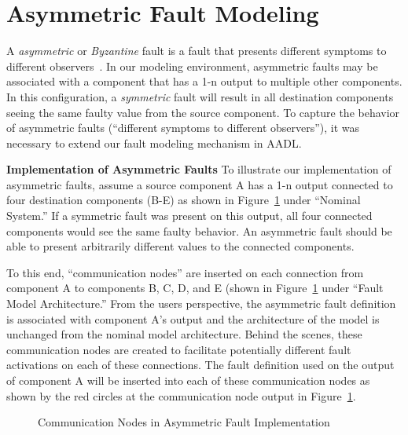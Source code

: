 \section{Asymmetric Fault Modeling}
\label{sec:byzantine}
A \textit{asymmetric} or \textit{Byzantine} fault is a fault that presents different symptoms to different observers~\cite{Driscoll-Byzantine-Fault}. In our modeling environment, asymmetric faults may be associated with a component that has a 1-n output to multiple other components. In this configuration, a \textit{symmetric} fault will result in all destination components seeing the same faulty value from the source component. To capture the behavior of asymmetric faults (``different symptoms to different observers''), it was necessary to extend our fault modeling mechanism in AADL. 

\textbf{Implementation of Asymmetric Faults}
To illustrate our implementation of asymmetric faults, assume a source component A has a 1-n output connected to four destination components (B-E) as shown in Figure~\ref{fig:commNodes} under ``Nominal System.'' If a symmetric fault was present on this output, all four connected components would see the same faulty behavior. An asymmetric fault should be able to present arbitrarily different values to the connected components. 

To this end, ``communication nodes'' are inserted on each connection from component A to components B, C, D, and E (shown in Figure~\ref{fig:commNodes} under ``Fault Model Architecture.'' From the users perspective, the asymmetric fault definition is associated with component A's output and the architecture of the model is unchanged from the nominal model architecture. Behind the scenes, these communication nodes are created to facilitate potentially different fault activations on each of these connections. The fault definition used on the output of component A will be inserted into each of these communication nodes as shown by the red circles at the communication node output in Figure~\ref{fig:commNodes}.
\begin{figure}[!htb]
        \caption{\label{fig:commNodes} Communication Nodes in Asymmetric Fault Implementation}
\end{figure}

